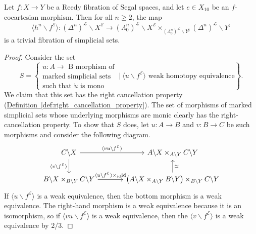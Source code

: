 \documentclass[main.tex]{subfiles}
\begin{document}
\begin{proposition}
  \label{prop:segal_cocartesian_morphisms_are_quasicategory_cocartesian}
  Let $f\colon X \to Y$ be a Reedy fibration of Segal spaces, and let $e \in X_{10}$ be an $f$-cocartesian morphism. Then for all $n \geq 2$, the map
  \begin{equation*}
    \langle h^{n} \backslash f^{\mathcal{E}} \rangle\colon (\Delta^{n})^{\mathcal{L}} \backslash X^{\mathcal{E}} \to (\Lambda^{n}_{0})^{\mathcal{L}} \backslash X^{\mathcal{E}} \times_{(\Lambda^{n}_{0})^{\mathcal{L}} \backslash Y^{\sharp}} (\Delta^{n})^{\mathcal{L}} \backslash Y^{\sharp}
  \end{equation*}
  is a trivial fibration of simplicial sets.
\end{proposition}
\begin{proof}
  Consider the set
  \begin{equation*}
    S =
    \left\{
      \substack{
        u\colon A \to \text{ B morphism of} \\
        \text{marked simplicial sets} \\
        \text{such that $\mathring{u}$ is mono}
      }
      \ \bigg| \
      \langle u \backslash f^{\mathcal{E}} \rangle \text{ weak homotopy equivalence}
    \right\}.
  \end{equation*}
  We claim that this set has the right cancellation property (\hyperref[def:right_cancellation_property]{Definition~\ref*{def:right_cancellation_property}}). The set of morphisms of marked simplicial sets whose underlying morphisms are monic clearly has the right-cancellation property. To show that $S$ does, let $u\colon A \to B$ and $v\colon B \to C$ be such morphisms and consider the following diagram.
  \begin{equation*}
    \begin{tikzcd}[column sep=large]
      C \backslash X
      \arrow[r, "\langle vu \backslash f^{\mathcal{E}} \rangle"]
      \arrow[d, swap, "\langle v \backslash f^{\mathcal{E}} \rangle"]
      & A \backslash X \times_{A \backslash Y} C \backslash Y
      \\
      B \backslash X \times_{B \backslash Y} C \backslash Y
      \arrow[r, "\langle u \backslash f^{\mathcal{E}} \rangle \times_{\id} \id"]
      & \left( A \backslash X \times_{A \backslash Y} B \backslash Y \right) \times_{B \backslash Y} C \backslash Y
      \arrow[u, swap, "\simeq"]
    \end{tikzcd}
  \end{equation*}
  If $\langle u \backslash f^{\mathcal{E}} \rangle$ is a weak equivalence, then the bottom morphism is a weak equivalence. The right-hand morphism is a weak equivalence because it is an isomorphism, so if $\langle vu \backslash f^{\mathcal{E}} \rangle$ is a weak equivalence, then the $\langle v \backslash f^{\mathcal{E}} \rangle$ is a weak equivalence by $2 / 3$.


\end{proof}
\end{document}

